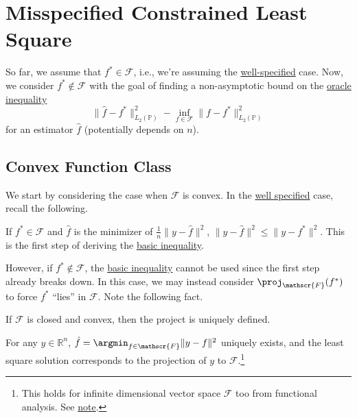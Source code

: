 \section{Misspecified Constrained Least Square}
So far, we assume that \(f^{\ast} \in \mathscr{F} \), i.e., we're assuming the \hyperref[def:well-specified]{well-specified} case. Now, we consider \(f^{\ast} \notin \mathscr{F} \) with the goal of finding a non-asymptotic bound on the \hyperref[eq:oracle-inequality]{oracle inequality}
\[
	\lVert \hat{f} - f^{\ast}  \rVert _{L_2(\mathbb{P} )}^2 - \inf _{f \in \mathscr{F} } \lVert f - f^{\ast}  \rVert _{L_2(\mathbb{P} )} ^2
\]
for an estimator \(\hat{f} \) (potentially depends on \(n\)).

\subsection{Convex Function Class}
We start by considering the case when \(\mathscr{F} \) is convex. In the \hyperref[def:well-specified]{well specified} case, recall the following.

\begin{prev}
	If \(f^{\ast} \in \mathscr{F} \) and \(\hat{f} \) is the minimizer of \(\frac{1}{n} \lVert y - \hat{f} \rVert ^2 \), \(\lVert y - \hat{f} \rVert ^2 \leq \lVert y - f^{\ast} \rVert ^2\). This is the first step of deriving the \hyperref[eq:basic-inequality]{basic inequality}.
\end{prev}

However, if \(f^{\ast} \notin \mathscr{F} \), the \hyperref[eq:basic-inequality]{basic inequality} cannot be used since the first step already breaks down. In this case, we may instead consider \(\proj_{\mathscr{F} }(f^{\ast} ) \) to force \(f^{\ast} \) ``lies'' in \(\mathscr{F} \). Note the following fact.

\begin{note}
	If \(\mathscr{F} \) is closed and convex, then the project is uniquely defined.
\end{note}
\begin{explanation}
	For any \(y\in \mathbb{R} ^n\), \(\hat{f} = \argmin_{f\in \mathscr{F} } \lVert y - f \rVert ^2\) uniquely exists, and the least square solution corresponds to the projection of \(y\) to \(\mathscr{F} \).\footnote{This holds for infinite dimensional vector space \(\mathscr{F} \) too from functional analysis. See \href{https://www.pbb.wtf/posts/Notes\#functional-analysis-math602}{note}.}
\end{explanation}

